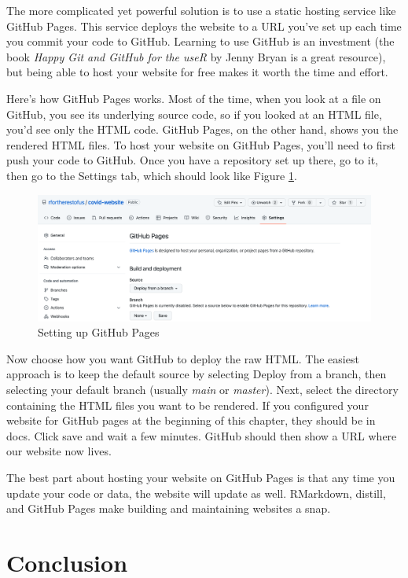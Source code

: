 \documentclass[
]{book}
\begin{document}
The more complicated yet powerful solution is to use a static hosting service like GitHub Pages. This service deploys the website to a URL you've set up each time you commit your code to GitHub. Learning to use GitHub is an investment (the book \emph{Happy Git and GitHub for the useR} by Jenny Bryan is a great resource), but being able to host your website for free makes it worth the time and effort.

Here's how GitHub Pages works. Most of the time, when you look at a file on GitHub, you see its underlying source code, so if you looked at an HTML file, you'd see only the HTML code. GitHub Pages, on the other hand, shows you the rendered HTML files. To host your website on GitHub Pages, you'll need to first push your code to GitHub. Once you have a repository set up there, go to it, then go to the Settings tab, which should look like Figure \ref{fig:gh-pages}.

\begin{figure}
\includegraphics[width=1\linewidth]{assets/gh-pages} \caption{Setting up GitHub Pages}\label{fig:gh-pages}
\end{figure}

Now choose how you want GitHub to deploy the raw HTML. The easiest approach is to keep the default source by selecting Deploy from a branch, then selecting your default branch (usually \emph{main} or \emph{master}). Next, select the directory containing the HTML files you want to be rendered. If you configured your website for GitHub pages at the beginning of this chapter, they should be in docs. Click save and wait a few minutes. GitHub should then show a URL where our website now lives.

The best part about hosting your website on GitHub Pages is that any time you update your code or data, the website will update as well. RMarkdown, distill, and GitHub Pages make building and maintaining websites a snap.

\hypertarget{conclusion-5}{%
\section*{Conclusion}\label{conclusion-5}}
\end{document}
